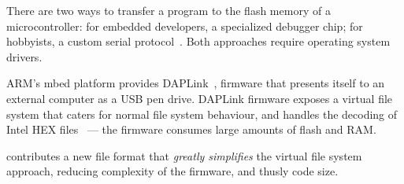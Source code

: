 There are two ways to transfer a program to the flash memory of a microcontroller: for embedded developers, a specialized debugger chip; for hobbyists, a custom serial protocol~\cite{AVRDUDEA15:online}. Both approaches require operating system drivers.

ARM's mbed platform provides DAPLink~\cite{GitHubAR5:online}, firmware that presents itself to an external computer as a USB pen drive. DAPLink firmware exposes a virtual file system that caters for normal file system behaviour, and handles the decoding of Intel HEX files~\cite{IntelHEX} --- the firmware consumes large amounts of flash and RAM.

\UF contributes a new file format that \emph{greatly simplifies} the virtual file system approach, reducing complexity of the firmware, and thusly code size.











